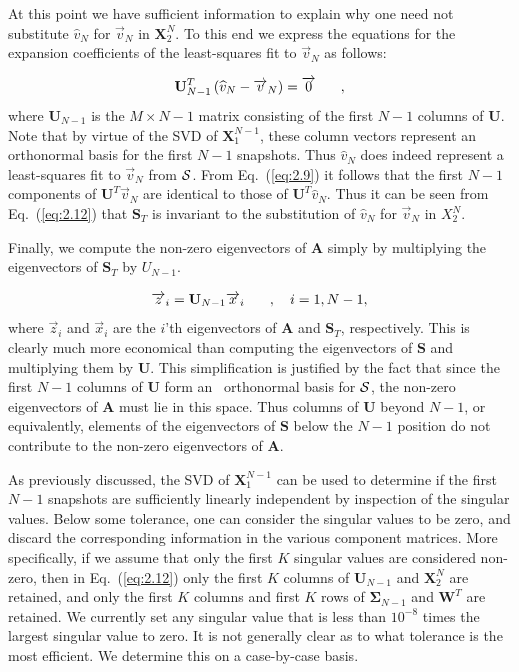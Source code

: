 \documentclass[12pt]{article}
\newcommand{\fn}[1]{\left( #1 \right)}
\renewcommand{\vec}[1]{\overrightarrow{#1}}
\newcommand{\be}{\begin{equation}}
\newcommand{\ee}{\end{equation}}
\newcommand{\pec}{\hspace{0.25in},}
\newcommand{\LEQ}[1]{\label{eq:#1}}
\newcommand{\EQ}[1]{Eq.~(\ref{eq:#1})}
\newcommand{\cS}{{\cal S}}
\newcommand{\mA}{\mathbf{A}}
\newcommand{\mX}{\mathbf{X}}
\newcommand{\mU}{\mathbf{U}}
\newcommand{\mW}{\mathbf{W}}
\newcommand{\mSigma}{\mathbf{\Sigma}}
\newcommand{\mS}{\mathbf{S}}
\begin{document}
At this point we have sufficient information to explain why one need not substitute $\widehat{v}_N$ 
	for $\vec{v}_N$ in $\mX_2^{N}$.  
To this end we express the equations for the expansion coefficients of the least-squares fit to 
	$\vec{v}_N$ as follows:
 
\be
	\mU^T_{N-1}\fn{\widehat{v}_N - \vec{v}_N} = \vec{0} \pec
	\LEQ{2.9}
\ee
where $\mU_{N-1}$ is the $M \times N-1$ matrix consisting of the first $N-1$ columns of $\mU$. 
Note that by virtue of the SVD of $\mX_{1}^{N-1}$, these column vectors represent an orthonormal 
	basis for the first $N-1$ snapshots.  
Thus $\widehat{v}_N$ does indeed represent a least-squares fit to $\vec{v}_N$ from $\cS$.  
From \EQ{2.9} it follows that the first $N-1$ components of $\mU^T \vec{v}_N$ are identical to those 
	of $\mU^T \widehat{v}_N$. 
Thus it can be seen from \EQ{2.12} that $\mS_T$ is invariant to the substitution of $\widehat{v}_N$ for 
	$\vec{v}_N$ in $X_{2}^{N}$.

Finally, we compute the non-zero eigenvectors of $\mA$ simply by multiplying the eigenvectors of 
	$\mS_T$ by $U_{N-1}$. 

\be
	\vec{z}_i = \mU_{N-1} \vec{x}_i \pec \quad i=1,N-1,
	\LEQ{2.13}
\ee
where $\vec{z}_i$ and $\vec{x}_i$ are the $i$'th eigenvectors of $\mA$ and $\mS_T$, respectively.  
This is clearly much more economical than computing the eigenvectors of $\mS$ and multiplying them by $\mU$.  
This simplification is justified by the fact that since the first $N-1$ columns of $\mU$ form an \	
	orthonormal basis for $\cS$, the non-zero eigenvectors of $\mA$ must lie in this space.  
Thus columns of $\mU$ beyond $N-1$, or equivalently, elements of the eigenvectors of $\mS$ below 
	the $N-1$ position do not contribute to the non-zero eigenvectors of $\mA$. 

As previously discussed, the SVD of $\mX_{1}^{N-1}$ can be used to determine if the first $N-1$ 
	snapshots are sufficiently linearly independent by inspection of the singular values.  
Below some tolerance, one can consider the singular values to be zero, and discard the corresponding 
	information in the various component matrices. 
More specifically, if we assume that only the first $K$ singular values are considered non-zero, then in 
	\EQ{2.12} only the first $K$ columns of $\mU_{N-1}$ and $\mX_{2}^{N}$ are retained, and only the 
	first $K$ columns and first $K$ rows of $\mSigma_{N-1}$ and $\mW^T$ are retained.  
We currently set any singular value that is less than $10^{-8}$ times the largest singular value to zero. 
It is not generally clear as to what tolerance is the most efficient.  
We determine this on a case-by-case basis.
\end{document}
